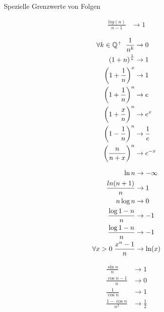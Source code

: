 \begin{highlight}{Spezielle Grenzwerte von Folgen}
\begin{center}
\begin{minipage}{0.3\linewidth}
\begin{align*}
                \frac{log(n)}{n - 1} &\to 1
            \end{align*}
        \end{minipage}
        \hfill\vline\hfill
        \begin{minipage}{0.3\linewidth}
            \begin{align*}
                \forall k \in \mathbb{Q}^+ \hspace{2mm}\frac{1}{n^k} &\to 0\\
                \left(1 + n\right)^{\frac{1}{n}} &\to 1\\
                \left(1 + \frac{1}{n}\right)^x &\to 1\\
                \left(1 + \frac{1}{n}\right)^n &\to e\\
                \left(1 + \frac{x}{n}\right)^n &\to e^x\\
                \left(1 - \frac{1}{n}\right)^n &\to \frac{1}{e}\\
                \left(\frac{n}{n + x}\right)^n &\to e^{-x}
            \end{align*}
        \end{minipage}
    \end{center}
     \begin{minipage}{0.3\linewidth}
        \begin{align*}
            \ln n &\to -\infty\\
            \frac{ln(n+1)}{n} &\to 1\\
            n \log n &\to 0\\
            \frac{\log 1 - n}{n} &\to -1\\
            \frac{\log 1 - n}{n} &\to -1\\
            \forall x>0 \hspace{1mm}\frac{x^n-1}{n} &\to \ln(x)
        \end{align*}
    \end{minipage}
    \hfill\vline\hfill
    \begin{minipage}{0.3\linewidth}
        \begin{align*}
            \frac{\sin n}{n} &\to 1\\
            \frac{\cos n - 1}{n} &\to 0\\
            \frac{1}{\cos n} &\to 1\\
            \frac{1 - \cos n}{n^2} &\to \frac{1}{2}

\end{align*}
\end{minipage}
\end{highlight}
